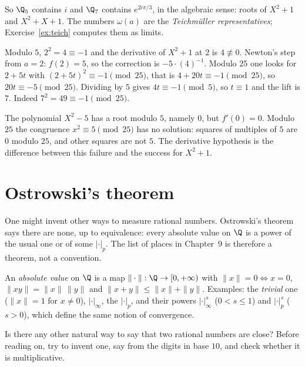 So $\Q_5$ contains $i$ and $\Q_7$ contains $e^{2i\pi/3}$, in the algebraic sense: roots of $X^2+1$ and $X^2+X+1$. The numbers $\omega(a)$ are the \emph{Teichm\"uller representatives}; Exercise~\ref{ex:teich} computes them as limits.

\begin{examplex}
Modulo $5$, $2^2=4\equiv -1$ and the derivative of $X^2+1$ at $2$ is $4\not\equiv 0$. Newton's step from $a=2$: $f(2)=5$, so the correction is $-5\cdot(4)^{-1}$. Modulo $25$ one looks for $2+5t$ with $(2+5t)^2\equiv -1\pmod{25}$, that is $4+20t\equiv -1\pmod{25}$, so $20t\equiv -5\pmod{25}$. Dividing by $5$ gives $4t\equiv -1\pmod 5$, so $t\equiv 1$ and the lift is $7$. Indeed $7^2=49\equiv -1\pmod{25}$.
\end{examplex}

\begin{examplex}
The polynomial $X^2-5$ has a root modulo $5$, namely $0$, but $f'(0)=0$. Modulo $25$ the congruence $x^2\equiv 5\pmod{25}$ has no solution: squares of multiples of $5$ are $0$ modulo $25$, and other squares are not $5$. The derivative hypothesis is the difference between this failure and the success for $X^2+1$.
\end{examplex}

\section{Ostrowski's theorem}

One might invent other ways to measure rational numbers. Ostrowski's theorem says there are none, up to equivalence: every absolute value on $\Q$ is a power of the usual one or of some $|\cdot|_p$. The list of places in Chapter~9 is therefore a theorem, not a convention.

An \emph{absolute value} on $\Q$ is a map $\|\cdot\|:\Q\to[0,+\infty)$ with $\|x\|=0\iff x=0$, $\|xy\|=\|x\|\,\|y\|$ and $\|x+y\|\le\|x\|+\|y\|$. Examples: the \emph{trivial} one ($\|x\|=1$ for $x\ne0$), $|\cdot|_\infty$, the $|\cdot|_p$, and their powers $|\cdot|_\infty^s$ ($0<s\le1$) and $|\cdot|_p^s$ ($s>0$), which define the same notion of convergence.

\begin{think}
Is there any other natural way to say that two rational numbers are close? Before reading on, try to invent one, say from the digits in base $10$, and check whether it is multiplicative.
\end{think}

